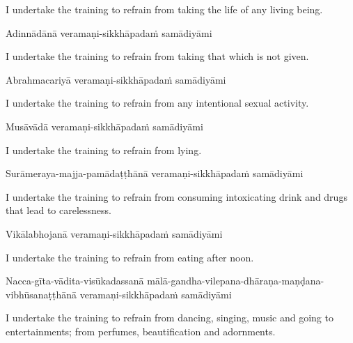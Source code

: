 \begin{english-hang}
  I undertake the training to refrain from taking the life of any living being.
\end{english-hang}

Adinnādānā veramaṇi-sikkhāpadaṁ samādiyāmi

\begin{english-hang}
  I undertake the training to refrain from taking that which is not given.
\end{english-hang}

Abrahmacariyā veramaṇi-sikkhāpadaṁ samādiyāmi

\begin{english-hang}
  I undertake the training to refrain from any intentional sexual activity.
\end{english-hang}

Musāvādā veramaṇi-sikkhāpadaṁ samādiyāmi

\begin{english}
  I undertake the training to refrain from lying.
\end{english}

\begin{pali-hang}
  Surāmeraya-majja-pamādaṭṭhānā veramaṇi-sikkhāpadaṁ samādiyāmi
\end{pali-hang}

\begin{english-hang}
  I undertake the training to refrain from consuming intoxicating drink and drugs that\hyperlink{endnote141-appendix}{\hypertarget{endnote141-body}{}}
  lead to carelessness.
\end{english-hang}

Vikālabhojanā veramaṇi-sikkhāpadaṁ samādiyāmi

\begin{english}
  I undertake the training to refrain from eating after noon.\hyperlink{endnote142-appendix}{\hypertarget{endnote142-body}{}}
\end{english}

\begin{pali-hang}
  Nacca-gīta-vādita-visūkadassanā mālā-gandha-vilepana-dhāraṇa-maṇḍana-vibhūsanaṭṭhānā veramaṇi-sikkhāpadaṁ samādiyāmi
\end{pali-hang}

\begin{english-hang}
  I undertake the training to refrain from dancing, singing, music and going to entertainments; from perfumes, beautification and adornments.\hyperlink{endnote143-appendix}{\hypertarget{endnote143-body}{}}
\end{english-hang}

